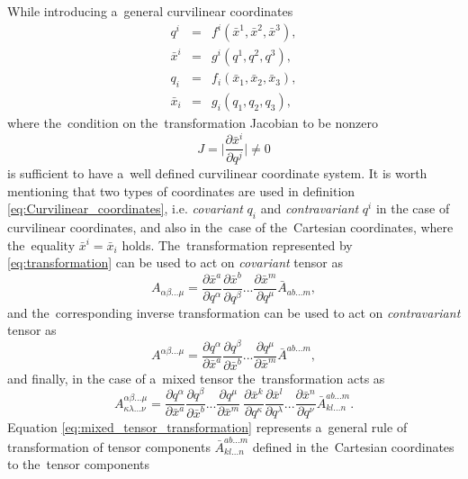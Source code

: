 \documentclass[preprint,12pt]{elsarticle}
\newcommand{\pdv}[2]{\frac{\partial{#1}}{\partial{#2}}}
\begin{document}
While introducing a~general curvilinear coordinates
\begin{eqnarray}
  q^i &=& f^i(\bar{x}^1, \bar{x}^2, \bar{x}^3) , \nonumber \\
  \bar{x}^i &=& g^i(q^1, q^2, q^3) , \nonumber \\
  q_i &=& f_i(\bar{x}_1, \bar{x}_2, \bar{x}_3) , \nonumber \\
  \bar{x}_i &=& g_i(q_1, q_2, q_3) , 
  \label{eq:Curvilinear_coordinates} 
\end{eqnarray}
where the~condition on the~transformation Jacobian to be nonzero
\begin{equation}
  J = \bigg| \pdv{\bar{x}^i}{q^j}\bigg| \neq 0
  \label{eq:transformation}
\end{equation}
is sufficient to have a~well defined curvilinear coordinate system.
It is worth mentioning that two types of coordinates are used in definition
\eqref{eq:Curvilinear_coordinates}, i.e. \textit{covariant} $q_i$ and 
\textit{contravariant} $q^i$ in the case of curvilinear coordinates, and
also in the~case of the~Cartesian coordinates, where the~equality 
$\bar{x}^i = \bar{x}_i$  
holds. The~transformation represented by \eqref{eq:transformation} can be
used to act on \textit{covariant} tensor as
\begin{equation}
  A_{\alpha\beta...\mu} = \pdv{\bar{x}^a}{q^\alpha} \pdv{\bar{x}^b}{q^\beta} ...
  \pdv{\bar{x}^m}{q^\mu} \bar{A}_{ab...m} ,
  \label{eq:covariant_tensor_transformation}
\end{equation}
and the~corresponding inverse transformation can be
used to act on \textit{contravariant} tensor as
\begin{equation}
  A^{\alpha\beta...\mu} = \pdv{q^\alpha}{\bar{x}^a} \pdv{q^\beta}{\bar{x}^b} ...
  \pdv{q^\mu}{\bar{x}^m} \bar{A}^{ab...m} ,
  \label{eq:contravariant_tensor_transformation}
\end{equation}
and finally, in the case of a~mixed tensor the~transformation acts as
\begin{equation}
  A^{\alpha\beta...\mu}_{\kappa\lambda...\nu}  = 
  \pdv{q^\alpha}{\bar{x}^a} \pdv{q^\beta}{\bar{x}^b} ...
  \pdv{q^\mu}{\bar{x}^m}~
  \pdv{\bar{x}^k}{q^\kappa} \pdv{\bar{x}^l}{q^\lambda} ...
  \pdv{\bar{x}^n}{q^\nu} 
  \bar{A}^{ab...m}_{kl...n}.
  \label{eq:mixed_tensor_transformation}
\end{equation}
Equation \eqref{eq:mixed_tensor_transformation} represents a~general rule of
transformation of tensor components $\bar{A}^{ab...m}_{kl...n}$ defined in
the~Cartesian coordinates to the~tensor components 
\end{document}
